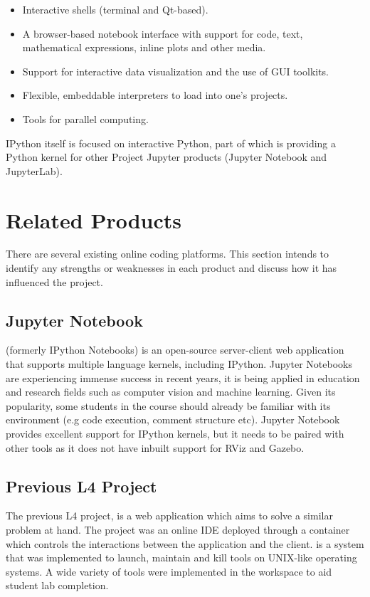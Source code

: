 \documentclass{l4proj}
\begin{document}
\begin{itemize}
    \item 
    Interactive shells (terminal and Qt-based).
    \item 
    A browser-based notebook interface with support for code, text, mathematical expressions, inline plots and other media.
    \item 
    Support for interactive data visualization and the use of GUI toolkits.
    \item 
    Flexible, embeddable interpreters to load into one's projects.
    \item 
    Tools for parallel computing.
\end{itemize}

IPython itself is focused on interactive Python, part of which is providing a Python kernel for other Project Jupyter products (Jupyter Notebook and JupyterLab).

\section{Related Products}
There are several existing online coding platforms. This section intends to identify any strengths or weaknesses in each product and discuss how it has influenced the project.

\subsection{Jupyter Notebook}

\cite{JupyterNotebook} (formerly IPython Notebooks) is an open-source server-client web application that supports multiple language kernels, including IPython. Jupyter Notebooks are experiencing immense success in recent years, it is being applied in education and research fields such as computer vision and machine learning. Given its popularity, some students in the course should already be familiar with its environment (e.g code execution, comment structure etc).  Jupyter Notebook provides excellent support for IPython kernels, but it needs to be paired with other tools as it does not have inbuilt support for RViz and Gazebo.

\subsection{Previous L4 Project}
The previous L4 project, \cite{previousl4} is a web application which aims to solve a similar problem at hand. The project was an online IDE deployed through a \cite{Docker} container which controls the interactions between the application and the client. \cite{Supervisor} is a system that was implemented to launch, maintain and kill tools on UNIX-like operating systems. A wide variety of tools were implemented in the workspace to aid student lab completion. 
\end{document}
